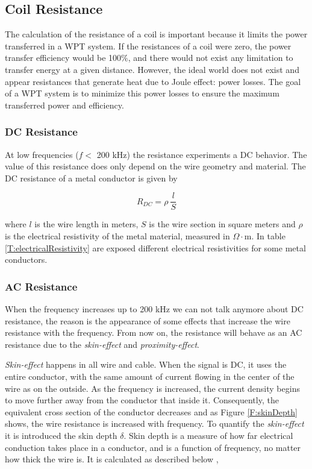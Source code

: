 		\subsection{Coil Resistance}\label{subsec:coilResistance}
The calculation of the resistance of a coil is important because it limits the power transferred in a WPT system. If the resistances of a coil were zero, the power transfer efficiency would be 100$\%$, and there would not exist any limitation to transfer energy at a given distance. However, the ideal world does not exist and appear resistances that generate heat due to Joule effect: power losses. The goal of a WPT system is to minimize this power losses to ensure the maximum transferred power and efficiency.

\subsubsection{DC Resistance}
At low frequencies ($f<$ 200 kHz) \cite{meyer} the resistance experiments a DC behavior. The value of this resistance does only depend on the wire geometry and material. The DC resistance of a metal conductor is given by \cite{medical}

\begin{equation}
R_{DC}=\rho\:\frac{l}{S}
\label{DCres}
\end{equation}

where $l$ is the wire length in meters, $S$ is the wire section in square meters and $\rho$ is the electrical resistivity of the metal material, measured in $\Omega\cdot$m. In table \ref{T:electricalResistivity} are exposed different electrical resistivities for some metal conductors.

\subsubsection{AC Resistance}
When the frequency increases up to 200 kHz we can not talk anymore about DC resistance, the reason is the appearance of some effects that increase the wire resistance with the frequency. From now on, the resistance will behave as an AC resistance due to the \textit{skin-effect} and \textit{proximity-effect}. 

\textit{Skin-effect} happens in all wire and cable. When the signal is DC, it uses the entire conductor, with the same amount of current flowing in the center of the wire as on the outside. As the frequency is increased, the current density begins to move further away from the conductor that inside it. Consequently, the equivalent cross section of the conductor decreases and as Figure \ref{F:skinDepth} shows, the wire resistance is increased with frequency. To quantify the \textit{skin-effect} it is introduced the skin depth $\delta$. Skin depth is a measure of how far electrical conduction takes place in a conductor, and is a function of frequency, no matter how thick the wire is. It is calculated as described below \cite{mit2},


